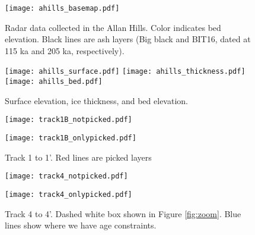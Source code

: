 \documentclass[11pt, oneside]{article}   	%
\begin{document}

\begin{figure}
	\centerline{\texttt{[image: ahills\_basemap.pdf]}}
	\caption{Radar data collected in the Allan Hills. Color indicates bed elevation. Black lines are ash layers (Big black and BIT16, dated at 115 ka and 205 ka, respectively).}
\end{figure}

\begin{figure}
	\texttt{[image: ahills\_surface.pdf]}
	\texttt{[image: ahills\_thickness.pdf]}
	\texttt{[image: ahills\_bed.pdf]}
	\caption{Surface elevation, ice thickness, and bed elevation.}
\end{figure}

\begin{figure}
	\centerline{\texttt{[image: track1B\_notpicked.pdf]}}
		\centerline{\texttt{[image: track1B\_onlypicked.pdf]}}
	\caption{Track 1 to 1'. Red lines are picked layers}
\end{figure}



\begin{figure}
	\centerline{\texttt{[image: track4\_notpicked.pdf]}}
	\centerline{\texttt{[image: track4\_onlypicked.pdf]}}
	\caption{Track 4 to 4'. Dashed white box shown in Figure \ref{fig:zoom}. Blue lines show where we have age constraints.}
\end{figure}

\end{document}
